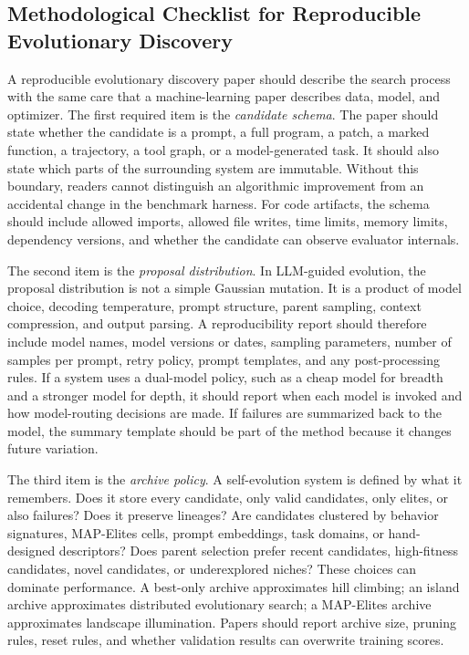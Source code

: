 \subsection{Methodological Checklist for Reproducible Evolutionary Discovery}
\label{subsec:evolution-methodological-checklist}

A reproducible evolutionary discovery paper should describe the search process with the same care that a machine-learning paper describes data, model, and optimizer.  The first required item is the \emph{candidate schema}.  The paper should state whether the candidate is a prompt, a full program, a patch, a marked function, a trajectory, a tool graph, or a model-generated task.  It should also state which parts of the surrounding system are immutable.  Without this boundary, readers cannot distinguish an algorithmic improvement from an accidental change in the benchmark harness.  For code artifacts, the schema should include allowed imports, allowed file writes, time limits, memory limits, dependency versions, and whether the candidate can observe evaluator internals.

The second item is the \emph{proposal distribution}.  In LLM-guided evolution, the proposal distribution is not a simple Gaussian mutation.  It is a product of model choice, decoding temperature, prompt structure, parent sampling, context compression, and output parsing.  A reproducibility report should therefore include model names, model versions or dates, sampling parameters, number of samples per prompt, retry policy, prompt templates, and any post-processing rules.  If a system uses a dual-model policy, such as a cheap model for breadth and a stronger model for depth, it should report when each model is invoked and how model-routing decisions are made.  If failures are summarized back to the model, the summary template should be part of the method because it changes future variation.

The third item is the \emph{archive policy}.  A self-evolution system is defined by what it remembers.  Does it store every candidate, only valid candidates, only elites, or also failures?  Does it preserve lineages?  Are candidates clustered by behavior signatures, MAP-Elites cells, prompt embeddings, task domains, or hand-designed descriptors?  Does parent selection prefer recent candidates, high-fitness candidates, novel candidates, or underexplored niches?  These choices can dominate performance.  A best-only archive approximates hill climbing; an island archive approximates distributed evolutionary search; a MAP-Elites archive approximates landscape illumination.  Papers should report archive size, pruning rules, reset rules, and whether validation results can overwrite training scores.

